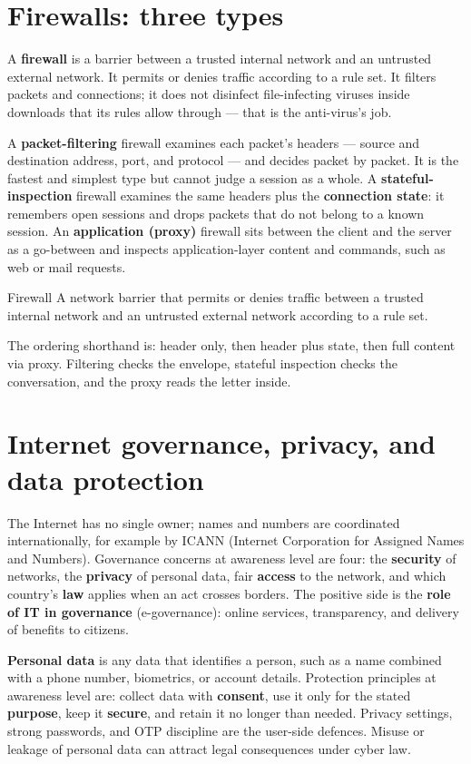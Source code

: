 \section{Firewalls: three types}
A \textbf{firewall} is a barrier between a trusted internal network and an
untrusted external network. It permits or denies traffic according to a rule
set. It filters packets and connections; it does not disinfect
file-infecting viruses inside downloads that its rules allow through --- that
is the anti-virus's job.

A \textbf{packet-filtering} firewall examines each packet's headers ---
source and destination address, port, and protocol --- and decides packet by
packet. It is the fastest and simplest type but cannot judge a session as a
whole. A \textbf{stateful-inspection} firewall examines the same headers plus
the \textbf{connection state}: it remembers open sessions and drops packets
that do not belong to a known session. An \textbf{application (proxy)}
firewall sits between the client and the server as a go-between and inspects
application-layer content and commands, such as web or mail requests.

\begin{definitionbox}{Firewall}
A network barrier that permits or denies traffic between a trusted internal
network and an untrusted external network according to a rule set.
\end{definitionbox}

The ordering shorthand is: header only, then header plus state, then full
content via proxy. Filtering checks the envelope, stateful inspection checks
the conversation, and the proxy reads the letter inside.

\section{Internet governance, privacy, and data protection}
The Internet has no single owner; names and numbers are coordinated
internationally, for example by ICANN (Internet Corporation for Assigned
Names and Numbers). Governance concerns at awareness level are four: the
\textbf{security} of networks, the \textbf{privacy} of personal data, fair
\textbf{access} to the network, and which country's \textbf{law} applies when
an act crosses borders. The positive side is the \textbf{role of IT in
governance} (e-governance): online services, transparency, and delivery of
benefits to citizens.

\textbf{Personal data} is any data that identifies a person, such as a name
combined with a phone number, biometrics, or account details. Protection
principles at awareness level are: collect data with \textbf{consent}, use it
only for the stated \textbf{purpose}, keep it \textbf{secure}, and retain it
no longer than needed. Privacy settings, strong passwords, and OTP discipline
are the user-side defences. Misuse or leakage of personal data can attract
legal consequences under cyber law.

